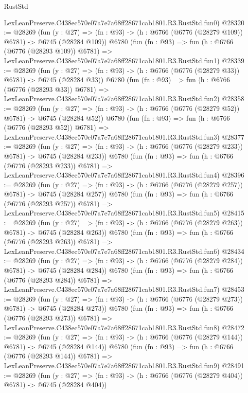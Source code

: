 \begin{lexlean}{RustStd}
\begin{coremodule}
    LexLeanPreserve.C438ec570e07a7e7a68ff28671cab1801.R3.RustStd.fun0)
@28320 := @28269
    (fun (y : @27) => (fn : @93) -> (h : @6766 (@6776 (@28279 @109)) @6781) -> @6745 (@28284 @109))
    @6780
    (fun (fn : @93) =>
    fun (h : @6766 (@6776 (@28293 @109)) @6781) =>
    LexLeanPreserve.C438ec570e07a7e7a68ff28671cab1801.R3.RustStd.fun1)
@28339 := @28269
    (fun (y : @27) => (fn : @93) -> (h : @6766 (@6776 (@28279 @33)) @6781) -> @6745 (@28284 @33))
    @6780
    (fun (fn : @93) =>
    fun (h : @6766 (@6776 (@28293 @33)) @6781) =>
    LexLeanPreserve.C438ec570e07a7e7a68ff28671cab1801.R3.RustStd.fun2)
@28358 := @28269
    (fun (y : @27) => (fn : @93) -> (h : @6766 (@6776 (@28279 @52)) @6781) -> @6745 (@28284 @52))
    @6780
    (fun (fn : @93) =>
    fun (h : @6766 (@6776 (@28293 @52)) @6781) =>
    LexLeanPreserve.C438ec570e07a7e7a68ff28671cab1801.R3.RustStd.fun3)
@28377 := @28269
    (fun (y : @27) => (fn : @93) -> (h : @6766 (@6776 (@28279 @233)) @6781) -> @6745 (@28284 @233))
    @6780
    (fun (fn : @93) =>
    fun (h : @6766 (@6776 (@28293 @233)) @6781) =>
    LexLeanPreserve.C438ec570e07a7e7a68ff28671cab1801.R3.RustStd.fun4)
@28396 := @28269
    (fun (y : @27) => (fn : @93) -> (h : @6766 (@6776 (@28279 @257)) @6781) -> @6745 (@28284 @257))
    @6780
    (fun (fn : @93) =>
    fun (h : @6766 (@6776 (@28293 @257)) @6781) =>
    LexLeanPreserve.C438ec570e07a7e7a68ff28671cab1801.R3.RustStd.fun5)
@28415 := @28269
    (fun (y : @27) => (fn : @93) -> (h : @6766 (@6776 (@28279 @263)) @6781) -> @6745 (@28284 @263))
    @6780
    (fun (fn : @93) =>
    fun (h : @6766 (@6776 (@28293 @263)) @6781) =>
    LexLeanPreserve.C438ec570e07a7e7a68ff28671cab1801.R3.RustStd.fun6)
@28434 := @28269
    (fun (y : @27) => (fn : @93) -> (h : @6766 (@6776 (@28279 @284)) @6781) -> @6745 (@28284 @284))
    @6780
    (fun (fn : @93) =>
    fun (h : @6766 (@6776 (@28293 @284)) @6781) =>
    LexLeanPreserve.C438ec570e07a7e7a68ff28671cab1801.R3.RustStd.fun7)
@28453 := @28269
    (fun (y : @27) => (fn : @93) -> (h : @6766 (@6776 (@28279 @273)) @6781) -> @6745 (@28284 @273))
    @6780
    (fun (fn : @93) =>
    fun (h : @6766 (@6776 (@28293 @273)) @6781) =>
    LexLeanPreserve.C438ec570e07a7e7a68ff28671cab1801.R3.RustStd.fun8)
@28472 := @28269
    (fun (y : @27) => (fn : @93) -> (h : @6766 (@6776 (@28279 @144)) @6781) -> @6745 (@28284 @144))
    @6780
    (fun (fn : @93) =>
    fun (h : @6766 (@6776 (@28293 @144)) @6781) =>
    LexLeanPreserve.C438ec570e07a7e7a68ff28671cab1801.R3.RustStd.fun9)
@28491 := @28269
    (fun (y : @27) => (fn : @93) -> (h : @6766 (@6776 (@28279 @404)) @6781) -> @6745 (@28284 @404))

\end{coremodule}
\end{lexlean}
